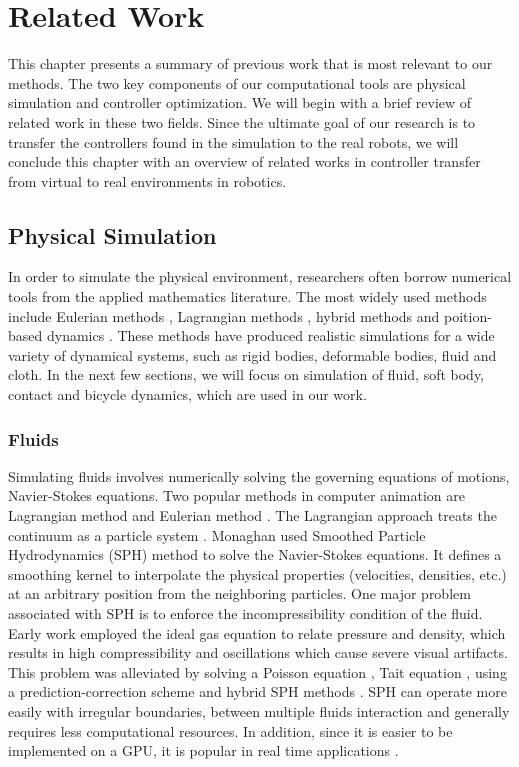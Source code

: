 \chapter{Related Work}

This chapter presents a summary of previous work that is most relevant to our methods. The two key components of our computational tools are physical simulation and controller optimization. We will begin with a brief review of related work in these two fields. Since the ultimate goal of our research is to transfer the controllers found in the simulation to the real robots, we will conclude this chapter with an overview of related works in controller transfer from virtual to real environments in robotics.

\section{Physical Simulation}
In order to simulate the physical environment, researchers often borrow numerical tools from the applied mathematics literature. The most widely used methods include Eulerian methods \cite{}, Lagrangian methods \cite{}, hybrid methods \cite{} and poition-based dynamics \cite{}. These methods have produced realistic simulations for a wide variety of dynamical systems, such as rigid bodies, deformable bodies, fluid and cloth. In the next few sections, we will focus on simulation of fluid, soft body, contact and bicycle dynamics, which are used in our work.

\subsection{Fluids}

Simulating fluids involves numerically solving the governing equations of motions, Navier-Stokes equations. Two popular methods in computer animation are Lagrangian method and Eulerian method \cite{}. The Lagrangian approach treats the continuum as a particle system \cite{}. Monaghan\cite{} used Smoothed Particle Hydrodynamics (SPH) method to solve the Navier-Stokes equations. It defines a smoothing kernel to interpolate the physical
properties (velocities, densities, etc.) at an arbitrary position
from the neighboring particles. One major problem associated with SPH is to enforce the incompressibility condition of the fluid. Early work \cite{} employed the ideal gas equation to relate pressure and density, which results in high compressibility and oscillations which cause severe visual artifacts. This problem was alleviated by solving a Poisson equation \cite{}, Tait equation \cite{}, using a prediction-correction scheme \cite{} and hybrid SPH methods \cite{}. SPH can operate more easily with irregular boundaries, between
multiple fluids interaction and generally requires
less computational resources. In addition, since it is easier to be implemented on a GPU, it is popular in real time applications \cite{}.


